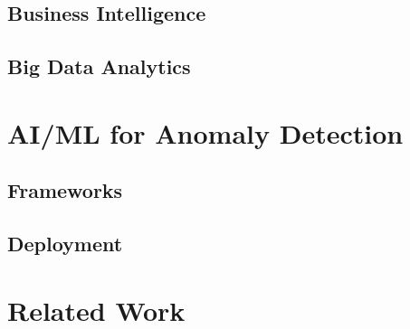 \subsection{Business Intelligence}
\subsection{Big Data Analytics}

\section{AI/ML for Anomaly Detection}
\subsection{Frameworks}
\subsection{Deployment}

\section{Related Work}
